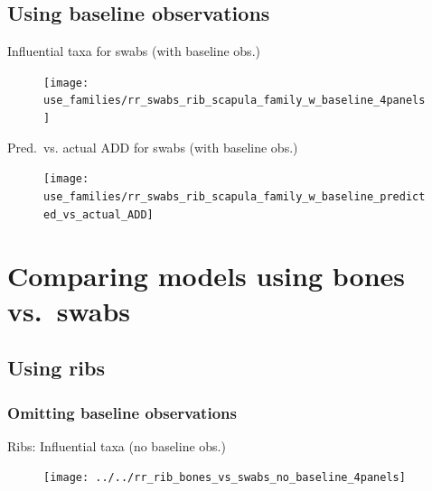 \documentclass{beamer}
\begin{document}
\subsection[With baseline]{Using baseline observations}

\begin{frame}{Influential taxa for swabs (with baseline obs.)}

  \begin{center}
    \begin{figure}
      \texttt{[image: use\_families/rr\_swabs\_rib\_scapula\_family\_w\_baseline\_4panels]}
    \end{figure}
  \end{center}

\end{frame}


\begin{frame}{Pred.\ vs. actual ADD for swabs (with baseline obs.)}

  \begin{center}
    \begin{figure}
      \texttt{[image: use\_families/rr\_swabs\_rib\_scapula\_family\_w\_baseline\_predicted\_vs\_actual\_ADD]}
    \end{figure}
  \end{center}

\end{frame}




\section[Bones vs.\ swabs]{Comparing models using bones vs.\ swabs}

\subsection[Ribs]{Using ribs}


\subsubsection[No baseline]{Omitting baseline observations}

\begin{frame}{Ribs: Influential taxa (no baseline obs.)}

  \begin{center}
    \begin{figure}
      \texttt{[image: ../../rr\_rib\_bones\_vs\_swabs\_no\_baseline\_4panels]}
    \end{figure}
  \end{center}

\end{frame}
\end{document}
